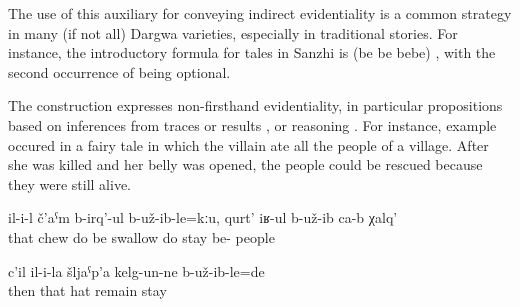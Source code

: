 The use of this auxiliary for conveying indirect evidentiality is a common strategy in many (if not all) Dargwa varieties, especially in traditional stories. For instance, the introductory formula for tales in Sanzhi is  (be be bebe) , with the second occurrence of  being optional.

The construction expresses non-firsthand evidentiality, in particular propositions based on inferences from traces or results ,  or reasoning . For instance, example  occured in a fairy tale in which the villain ate all the people of a village. After she was killed and her belly was opened, the people could be rescued because they were still alive.
%
\begin{exe}
	\ex	\label{ex:(It turned out that) she did not chew the people, but swallowed them@13}
	\gll	il-i-l	č'aˁm	b-irq'-ul	b-už-ib-le=kːu,	qurt' 	iʁ-ul	b-už-ib ca-b	χalq'\\
		that	chew	do	be	swallow	do	stay be- people\\
	\glt	{}

	\ex	\label{ex:Then (apparently) his hat remained there@14}
	\gll	c'il	il-i-la	šljaˁp'a	kelg-un-ne	b-už-ib-le=de\\
		then	that	hat	remain	stay\\
	\glt	{}
\end{exe}

